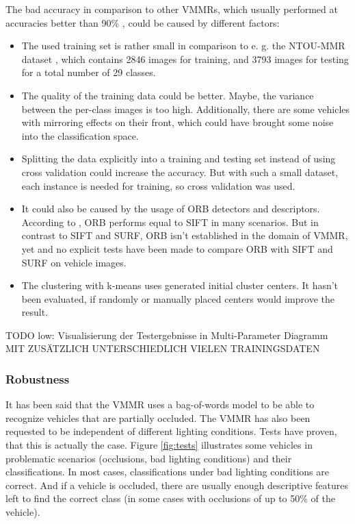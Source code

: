 The bad accuracy in comparison to other VMMRs, which usually performed at accuracies better than 90\% \citep{petrovic2004analysis} \citep{siddiqui2015robust}, could be caused by different factors:
\begin{itemize}
  \item The used training set is rather small in comparison to e. g. the NTOU-MMR dataset \citep{ntoummrDataset}, which contains 2846 images for training, and 3793 images for testing for a total number of 29 classes.
  \item The quality of the training data could be better. Maybe, the variance between the per-class images is too high. Additionally, there are some vehicles with mirroring effects on their front, which could have brought some noise into the classification space.
  \item Splitting the data explicitly into a training and testing set instead of using cross validation could increase the accuracy. But with such a small dataset, each instance is needed for training, so cross validation was used.
  \item It could also be caused by the usage of ORB detectors and descriptors. According to \citep{rublee2011orb}, ORB performs equal to SIFT in many scenarios. But in contrast to SIFT and SURF, ORB isn't established in the domain of VMMR, yet and no explicit tests have been made to compare ORB with SIFT and SURF on vehicle images.
  \item The clustering with k-means uses generated initial cluster centers. It hasn't been evaluated, if randomly or manually placed centers would improve the result.
\end{itemize}

TODO low: Visualisierung der Testergebnisse in Multi-Parameter Diagramm MIT ZUSÄTZLICH UNTERSCHIEDLICH VIELEN TRAININGSDATEN

\subsubsection{Robustness}
It has been said that the VMMR uses a bag-of-words model to be able to recognize vehicles that are partially occluded. The VMMR has also been requested to be independent of different lighting conditions. Tests have proven, that this is actually the case. Figure \ref{fig:tests} illustrates some vehicles in problematic scenarios (occlusions, bad lighting conditions) and their classifications. In most cases, classifications under bad lighting conditions are correct. And if a vehicle is occluded, there are usually enough descriptive features left to find the correct class (in some cases with occlusions of up to 50\% of the vehicle).

